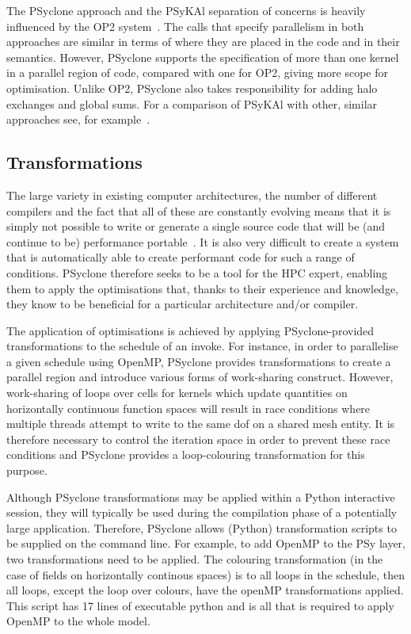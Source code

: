 \documentclass[review,times]{elsarticle}
\begin{document}
The PSyclone approach and the {PS}y{KA}l separation of concerns is
heavily influenced by the OP2 system~\citep{OP2, PYOP2}. The calls
that specify parallelism in both approaches are similar in terms of
where they are placed in the code and in their semantics. However,
PSyclone supports the specification of more than one kernel in a
parallel region of code, compared with one for OP2, giving more scope
for optimisation. Unlike OP2, PSyclone also takes responsibility for
adding halo exchanges and global sums. For a comparison of {PS}y{KA}l
with other, similar approaches see, for example~\cite{nemolite2d_psykal}.

\subsection{Transformations}

The large variety in existing computer architectures, the number of
different compilers and the fact that all of these are constantly
evolving means that it is simply not possible to write or generate a
single source code that will be (and continue to be) performance
portable~\cite{shallow_psykal, nemolite2d_psykal}.  It is also very
difficult to create a system that is automatically able to create
performant code for such a range of conditions. PSyclone therefore
seeks to be a tool for the HPC expert, enabling them to apply the
optimisations that, thanks to their experience and knowledge, they
know to be beneficial for a particular architecture and/or compiler.

The application of optimisations is achieved by applying
PSyclone-provided transformations to the schedule of an invoke.  For
instance, in order to parallelise a given schedule using OpenMP,
 PSyclone provides transformations to create a parallel region and
introduce various forms of work-sharing construct. However,
work-sharing of loops over cells for kernels which update quantities
on horizontally continuous function spaces will result in race
conditions where multiple threads attempt to write to the same dof on
a shared mesh entity. It
is therefore necessary to control the iteration space in order to
prevent these race conditions and PSyclone provides a loop-colouring
transformation for this purpose.

Although PSyclone transformations may be applied within a Python
interactive session, they will typically be used during the
compilation phase of a potentially large application. Therefore,
PSyclone allows (Python) transformation scripts to be supplied
on the command line. For example, to add OpenMP to the PSy layer,
two transformations need to be applied. The colouring transformation
(in the case of fields on horizontally continous spaces) is to all
loops in the schedule, then all loops, except the loop over colours,
have the openMP transformations applied. This script has 17 lines of
executable python and is all that is required to apply OpenMP to the
whole model. 
\end{document}
